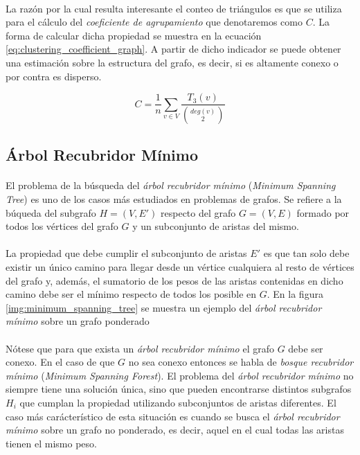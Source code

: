 \documentclass{subfiles}
\begin{document}
        \paragraph{}
        La razón por la cual resulta interesante el conteo de triángulos es que se utiliza para el cálculo del \emph{coeficiente de agrupamiento} que denotaremos como $C$. La forma de calcular dicha propiedad se muestra en la ecuación \eqref{eq:clustering_coefficient_graph}. A partir de dicho indicador se puede obtener una estimación sobre la estructura del grafo, es decir, si es altamente conexo o por contra es disperso.

        \begin{equation}
        \label{eq:clustering_coefficient_graph}
          C = \frac{1}{n} \sum_{v\in V} \frac{T_3(v)}{\binom{deg(v)}{2}}
        \end{equation}



      \subsection{Árbol Recubridor Mínimo}
      \label{sec:minimum_spanning_tree}

        \paragraph{}
        El problema de la búsqueda del \emph{árbol recubridor mínimo} (\emph{Minimum Spanning Tree}) es uno de los casos más estudiados en problemas de grafos. Se refiere a la búqueda del subgrafo $H = (V, E')$ respecto del grafo $G=(V, E)$ formado por todos los vértices del grafo $G$ y un subconjunto de aristas del mismo.

        \paragraph{}
        La propiedad que debe cumplir el subconjunto de aristas $E'$ es que tan solo debe existir un único camino para llegar desde un vértice cualquiera al resto de vértices del grafo y, además, el sumatorio de los pesos de las aristas contenidas en dicho camino debe ser el mínimo respecto de todos los posible en $G$. En la figura \ref{img:minimum_spanning_tree} se muestra un ejemplo del  \emph{árbol recubridor mínimo} sobre un grafo ponderado

        \paragraph{}
        Nótese que para que exista un \emph{árbol recubridor mínimo} el grafo $G$ debe ser conexo. En el caso de que $G$ no sea conexo entonces se habla de \emph{bosque recubridor mínimo} (\emph{Minimum Spanning Forest}). El problema del \emph{árbol recubridor mínimo} no siempre tiene una solución única, sino que pueden encontrarse distintos subgrafos $H_i$ que cumplan la propiedad utilizando subconjuntos de aristas diferentes. El caso más carácterístico de esta situación es cuando se busca el \emph{árbol recubridor mínimo} sobre un grafo no ponderado, es decir, aquel en el cual todas las aristas tienen el mismo peso.
\end{document}
